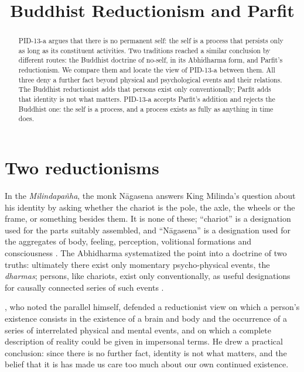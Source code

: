 \documentclass{situationist-preprint}
\title{Buddhist Reductionism and Parfit}
\begin{document}
\maketitle

\begin{abstract}
PID-13-a argues that there is no permanent self: the self is a process that persists only as long as its constituent activities. Two traditions reached a similar conclusion by different routes: the Buddhist doctrine of no-self, in its Abhidharma form, and Parfit's reductionism. We compare them and locate the view of PID-13-a between them. All three deny a further fact beyond physical and psychological events and their relations. The Buddhist reductionist adds that persons exist only conventionally; Parfit adds that identity is not what matters. PID-13-a accepts Parfit's addition and rejects the Buddhist one: the self is a process, and a process exists as fully as anything in time does.
\end{abstract}

\section{Two reductionisms}

In the \emph{Milindapa\~nha}, the monk N\=agasena answers King Milinda's question about his identity by asking whether the chariot is the pole, the axle, the wheels or the frame, or something besides them. It is none of these; \enquote{chariot} is a designation used for the parts suitably assembled, and \enquote{N\=agasena} is a designation used for the aggregates of body, feeling, perception, volitional formations and consciousness \citep{RhysDavids1890}. The Abhidharma systematized the point into a doctrine of two truths: ultimately there exist only momentary psycho-physical events, the \emph{dharmas}; persons, like chariots, exist only conventionally, as useful designations for causally connected series of such events \citep{Siderits2003,Collins1982}.

\citet[ch.~11 and App.~J]{Parfit1984}, who noted the parallel himself, defended a reductionist view on which a person's existence consists in the existence of a brain and body and the occurrence of a series of interrelated physical and mental events, and on which a complete description of reality could be given in impersonal terms. He drew a practical conclusion: since there is no further fact, identity is not what matters, and the belief that it is has made us care too much about our own continued existence.
\end{document}
